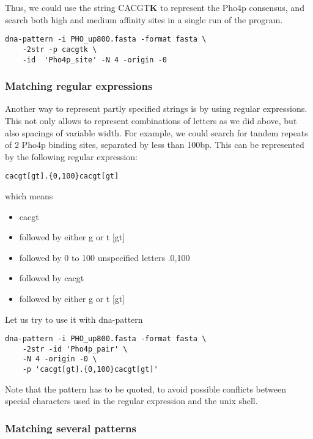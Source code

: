 Thus, we could use the string CACGT\textbf{K} to represent the Pho4p
consensus, and search both high and medium affinity sites in a single
run of the program.

\begin{verbatim}
dna-pattern -i PHO_up800.fasta -format fasta \
    -2str -p cacgtk \
    -id  'Pho4p_site' -N 4 -origin -0
\end{verbatim}

\subsubsection{Matching regular expressions}

Another way to represent partly specified strings is by using regular
expressions. This not only allows to represent combinations of letters
as we did above, but also spacings of variable width. For example, we
could search for tandem repeats of 2 Pho4p binding sites, separated by
less than 100bp. This can be represented by the following regular expression: 

\begin{verbatim}
cacgt[gt].{0,100}cacgt[gt]
\end{verbatim}

which means
\begin{itemize}
\item cacgt 
\item followed by either g or t [gt]
\item followed by 0 to 100 unspecified letters .{0,100}
\item followed by cacgt
\item followed by either g or t [gt]
\end{itemize}

Let us try to use it with dna-pattern

\begin{verbatim}
dna-pattern -i PHO_up800.fasta -format fasta \
    -2str -id 'Pho4p_pair' \
    -N 4 -origin -0 \
    -p 'cacgt[gt].{0,100}cacgt[gt]'
\end{verbatim}


Note that the pattern has to be quoted, to avoid possible conflicts
between special characters used in the regular expression and the unix
shell.


\subsubsection{Matching several patterns}

